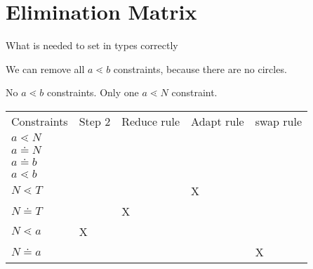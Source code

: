 \section{Elimination Matrix}
What is needed to set in types correctly

We can remove all $a \lessdot b$ constraints, because there are no circles.

No $a \lessdot b$ constraints.
Only one $a \lessdot N$ constraint.


\begin{table}[]
  \begin{tabular}{lllll}
  Constraints    & Step 2 & Reduce rule & Adapt rule & swap rule \\
  $a \lessdot N$ &        &             &            &           \\
  $a \doteq N$   &        &             &            &           \\
  $a \doteq b$   &        &             &            &           \\
  $a \lessdot b$ &        &             &            &           \\
  $N \lessdot T$ &        &             & X          &           \\
  $N \doteq T$   &        & X           &            &           \\
  $N \lessdot a$ & X      &             &            &           \\
  $N \doteq a$   &        &             &            & X        
  \end{tabular}
  \end{table}